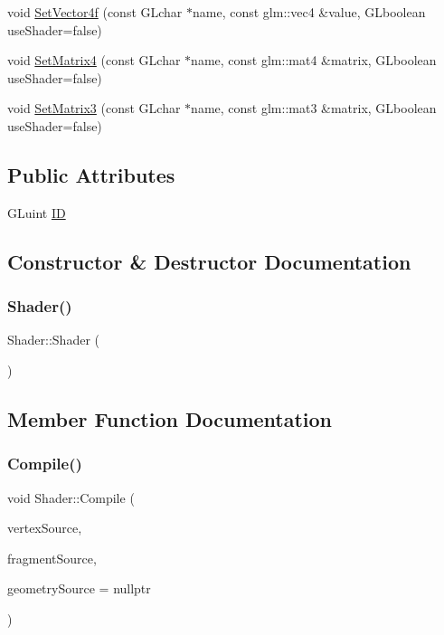 \begin{DoxyCompactItemize}
\item 
void \mbox{\hyperlink{class_shader_a2d24719a9edc9541bd01cf230f0b3a12}{Set\+Vector4f}} (const G\+Lchar $\ast$name, const glm\+::vec4 \&value, G\+Lboolean use\+Shader=false)
\item 
void \mbox{\hyperlink{class_shader_a0c8e93a639ef45644c1e27043be586b2}{Set\+Matrix4}} (const G\+Lchar $\ast$name, const glm\+::mat4 \&matrix, G\+Lboolean use\+Shader=false)
\item 
void \mbox{\hyperlink{class_shader_a70230092a3435a7c0a05736225bb0dd1}{Set\+Matrix3}} (const G\+Lchar $\ast$name, const glm\+::mat3 \&matrix, G\+Lboolean use\+Shader=false)
\end{DoxyCompactItemize}
\subsection*{Public Attributes}
\begin{DoxyCompactItemize}
\item 
G\+Luint \mbox{\hyperlink{class_shader_a7be2afcbd5ba5873a04536a2b4b5e576}{ID}}
\end{DoxyCompactItemize}


\subsection{Constructor \& Destructor Documentation}
\mbox{\label{class_shader_a0d654ebaca4e0555197c0724c6d30610}} 
\subsubsection{\texorpdfstring{Shader()}{Shader()}}
{\footnotesize\ttfamily Shader\+::\+Shader (\begin{DoxyParamCaption}{ }\end{DoxyParamCaption})\hspace{0.3cm}{\ttfamily [inline]}}



\subsection{Member Function Documentation}
\mbox{\label{class_shader_a4d42d98a025018d7ce564a78ac5b921e}} 
\subsubsection{\texorpdfstring{Compile()}{Compile()}}
{\footnotesize\ttfamily void Shader\+::\+Compile (\begin{DoxyParamCaption}\item[{const G\+Lchar $\ast$}]{vertex\+Source,  }\item[{const G\+Lchar $\ast$}]{fragment\+Source,  }\item[{const G\+Lchar $\ast$}]{geometry\+Source = {\ttfamily nullptr} }\end{DoxyParamCaption})}


